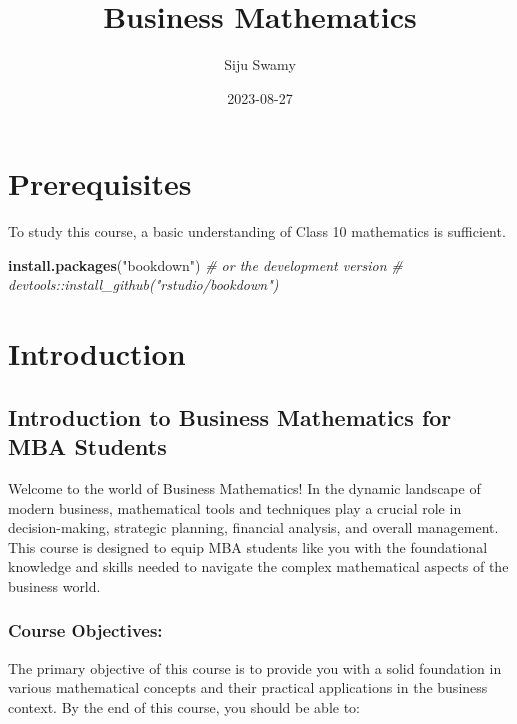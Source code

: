 \documentclass[
]{book}
\title{Business Mathematics}
\author{Siju Swamy}
\date{2023-08-27}
\newenvironment{Shaded}{\begin{snugshade}}{\end{snugshade}}
\newcommand{\CommentTok}[1]{\textcolor[rgb]{0.56,0.35,0.01}{\textit{#1}}}
\newcommand{\FunctionTok}[1]{\textcolor[rgb]{0.13,0.29,0.53}{\textbf{#1}}}
\newcommand{\NormalTok}[1]{#1}
\newcommand{\StringTok}[1]{\textcolor[rgb]{0.31,0.60,0.02}{#1}}
\theoremstyle{definition}
\theoremstyle{definition}
\theoremstyle{definition}
\theoremstyle{definition}
\theoremstyle{remark}
\begin{document}
\maketitle

{
\setcounter{tocdepth}{1}
\tableofcontents
}
\hypertarget{prerequisites}{%
\chapter{Prerequisites}\label{prerequisites}}

To study this course, a basic understanding of Class 10 mathematics is sufficient.

\begin{Shaded}
\begin{Highlighting}[]
\FunctionTok{install.packages}\NormalTok{(}\StringTok{"bookdown"}\NormalTok{)}
\CommentTok{\# or the development version}
\CommentTok{\# devtools::install\_github("rstudio/bookdown")}
\end{Highlighting}
\end{Shaded}

\hypertarget{intro}{%
\chapter{Introduction}\label{intro}}

\hypertarget{introduction-to-business-mathematics-for-mba-students}{%
\section{Introduction to Business Mathematics for MBA Students}\label{introduction-to-business-mathematics-for-mba-students}}

Welcome to the world of Business Mathematics! In the dynamic landscape of modern business, mathematical tools and techniques play a crucial role in decision-making, strategic planning, financial analysis, and overall management. This course is designed to equip MBA students like you with the foundational knowledge and skills needed to navigate the complex mathematical aspects of the business world.

\hypertarget{course-objectives}{%
\subsection{Course Objectives:}\label{course-objectives}}

The primary objective of this course is to provide you with a solid foundation in various mathematical concepts and their practical applications in the business context. By the end of this course, you should be able to:
\end{document}
